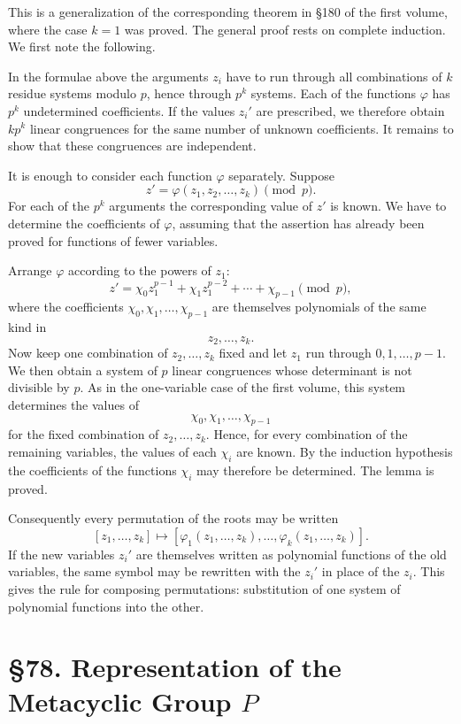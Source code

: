 \documentclass[11pt,a4paper]{book}
\newcommand{\webersection}[2]{\clearpage\section*{\S #1. #2}}
\begin{document}
This is a generalization of the corresponding theorem in \S 180 of the first volume, where the case \(k=1\) was proved.  The general proof rests on complete induction.  We first note the following.

In the formulae above the arguments \(z_i\) have to run through all combinations of \(k\) residue systems modulo \(p\), hence through \(p^k\) systems.  Each of the functions \(\varphi\) has \(p^k\) undetermined coefficients.  If the values \(z_i'\) are prescribed, we therefore obtain \(kp^k\) linear congruences for the same number of unknown coefficients.  It remains to show that these congruences are independent.

It is enough to consider each function \(\varphi\) separately.  Suppose
\[
 z'=\varphi(z_1,z_2,\ldots,z_k)\pmod p .
\]
For each of the \(p^k\) arguments the corresponding value of \(z'\) is known.  We have to determine the coefficients of \(\varphi\), assuming that the assertion has already been proved for functions of fewer variables.

Arrange \(\varphi\) according to the powers of \(z_1\):
\[
 z'=\chi_0 z_1^{p-1}+\chi_1 z_1^{p-2}+\cdots+\chi_{p-1}\pmod p,
\]
where the coefficients \(\chi_0,\chi_1,\ldots,\chi_{p-1}\) are themselves polynomials of the same kind in
\[
 z_2,\ldots,z_k.
\]
Now keep one combination of \(z_2,\ldots,z_k\) fixed and let \(z_1\) run through \(0,1,\ldots,p-1\).  We then obtain a system of \(p\) linear congruences whose determinant is not divisible by \(p\).  As in the one-variable case of the first volume, this system determines the values of
\[
 \chi_0,\chi_1,\ldots,\chi_{p-1}
\]
for the fixed combination of \(z_2,\ldots,z_k\).  Hence, for every combination of the remaining variables, the values of each \(\chi_i\) are known.  By the induction hypothesis the coefficients of the functions \(\chi_i\) may therefore be determined.  The lemma is proved.

Consequently every permutation of the roots may be written
\[
 [z_1,\ldots,z_k]\longmapsto
 [\varphi_1(z_1,\ldots,z_k),\ldots,\varphi_k(z_1,\ldots,z_k)].
\]
If the new variables \(z_i'\) are themselves written as polynomial functions of the old variables, the same symbol may be rewritten with the \(z_i'\) in place of the \(z_i\).  This gives the rule for composing permutations: substitution of one system of polynomial functions into the other.

\webersection{78}{Representation of the Metacyclic Group \(P\)}
\end{document}
